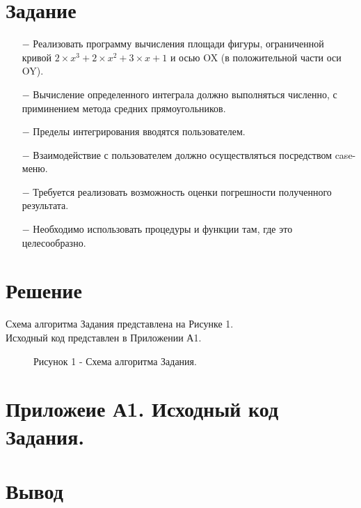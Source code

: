 \documentclass[oneside,a4paper,14pt]{extarticle}
\begin{document}
\section*{Задание}
\begin{itemize}
    \item[$-$] Реализовать программу вычисления площади фигуры, ограниченной кривой $2 \times x^3 + 2 \times x^2 + 3 \times x + 1$ и осью OX (в положительной части оси OY).
    \item[$-$] Вычисление определенного интеграла должно выполняться численно, с приминением метода средних прямоугольников.
    \item[$-$] Пределы интегрирования вводятся пользователем.
    \item[$-$] Взаимодействие с пользователем должно осуществляться посредством case-меню.
    \item[$-$] Требуется реализовать возможность оценки погрешности полученного результата.
    \item[$-$] Необходимо использовать процедуры и функции там, где это целесообразно.

\end{itemize}

\section*{Решение}
\noindent Схема алгоритма Задания представлена на Рисунке 1.\\
\noindent Исходный код представлен в Приложении А1.\\
\newpage
\begin{figure}[!ht]
	\centering
	\caption*{Рисунок 1 - Схема алгоритма Задания.}
\end{figure}

\section*{Приложеие А1. Исходный код Задания.}
\section*{Вывод}
\end{document}
